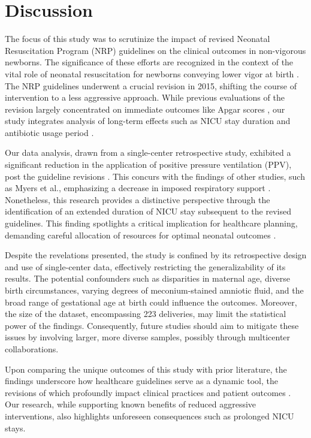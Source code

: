 \documentclass[11pt]{article}
\begin{document}
\section*{Discussion}

The focus of this study was to scrutinize the impact of revised Neonatal Resuscitation Program (NRP) guidelines on the clinical outcomes in non-vigorous newborns. The significance of these efforts are recognized in the context of the vital role of neonatal resuscitation for newborns conveying lower vigor at birth \cite{Chawla2020PerinatalNeonatalMO, Bera2014EffectOK, Wyckoff2015Part1N}. The NRP guidelines underwent a crucial revision in 2015, shifting the course of intervention to a less aggressive approach. While previous evaluations of the revision largely concentrated on immediate outcomes like Apgar scores \cite{Myers2020ImpactOT}, our study integrates analysis of long-term effects such as NICU stay duration and antibiotic usage period \cite{Rossi2021KnowledgeGE, VanderWeele2014OnTC}.

Our data analysis, drawn from a single-center retrospective study, exhibited a significant reduction in the application of positive pressure ventilation (PPV), post the guideline revisions \cite{Chandrasekharan2020NeonatalRA}. This concurs with the findings of other studies, such as Myers et al., emphasizing a decrease in imposed respiratory support \cite{Myers2020ImpactOT}. Nonetheless, this research provides a distinctive perspective through the identification of an extended duration of NICU stay subsequent to the revised guidelines. This finding spotlights a critical implication for healthcare planning, demanding careful allocation of resources for optimal neonatal outcomes \cite{Jennings2011TaskSI}.

Despite the revelations presented, the study is confined by its retrospective design and use of single-center data, effectively restricting the generalizability of its results. The potential confounders such as disparities in maternal age, diverse birth circumstances, varying degrees of meconium-stained amniotic fluid, and the broad range of gestational age at birth could influence the outcomes. Moreover, the size of the dataset, encompassing 223 deliveries, may limit the statistical power of the findings. Consequently, future studies should aim to mitigate these issues by involving larger, more diverse samples, possibly through multicenter collaborations.

Upon comparing the unique outcomes of this study with prior literature, the findings underscore how healthcare guidelines serve as a dynamic tool, the revisions of which profoundly impact clinical practices and patient outcomes \cite{Srenby2019ReducingRI,Goud2009EffectOG,Tapsell2017EffectOI}. Our research, while supporting known benefits of reduced aggressive interventions, also highlights unforeseen consequences such as prolonged NICU stays. 
\end{document}

